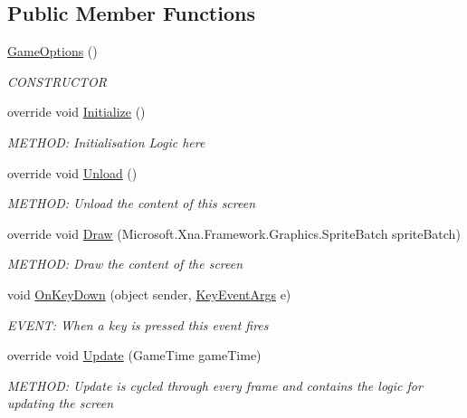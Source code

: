 \subsection*{Public Member Functions}
\begin{DoxyCompactItemize}
\item 
\hyperlink{a00558_aeea264989e80b36956d21eb8ecd53d07}{Game\+Options} ()
\begin{DoxyCompactList}\small\item\em C\+O\+N\+S\+T\+R\+U\+C\+T\+OR \end{DoxyCompactList}\item 
override void \hyperlink{a00558_a1547a699546baa41aa39a2e2b4412787}{Initialize} ()
\begin{DoxyCompactList}\small\item\em M\+E\+T\+H\+OD\+: Initialisation Logic here \end{DoxyCompactList}\item 
override void \hyperlink{a00558_aedf1c1415b77bf7c8ce37d754039de7b}{Unload} ()
\begin{DoxyCompactList}\small\item\em M\+E\+T\+H\+OD\+: Unload the content of this screen \end{DoxyCompactList}\item 
override void \hyperlink{a00558_a7668c0681e2f3bd52cb65b3abda014bd}{Draw} (Microsoft.\+Xna.\+Framework.\+Graphics.\+Sprite\+Batch sprite\+Batch)
\begin{DoxyCompactList}\small\item\em M\+E\+T\+H\+OD\+: Draw the content of the screen \end{DoxyCompactList}\item 
void \hyperlink{a00558_a595552ae004bb6c7d5d42605c1c5d239}{On\+Key\+Down} (object sender, \hyperlink{a00362}{Key\+Event\+Args} e)
\begin{DoxyCompactList}\small\item\em E\+V\+E\+NT\+: When a key is pressed this event fires \end{DoxyCompactList}\item 
override void \hyperlink{a00558_a629d2a00abd6bfcc21524911e74fee3a}{Update} (Game\+Time game\+Time)
\begin{DoxyCompactList}\small\item\em M\+E\+T\+H\+OD\+: Update is cycled through every frame and contains the logic for updating the screen \end{DoxyCompactList}\end{DoxyCompactItemize}
